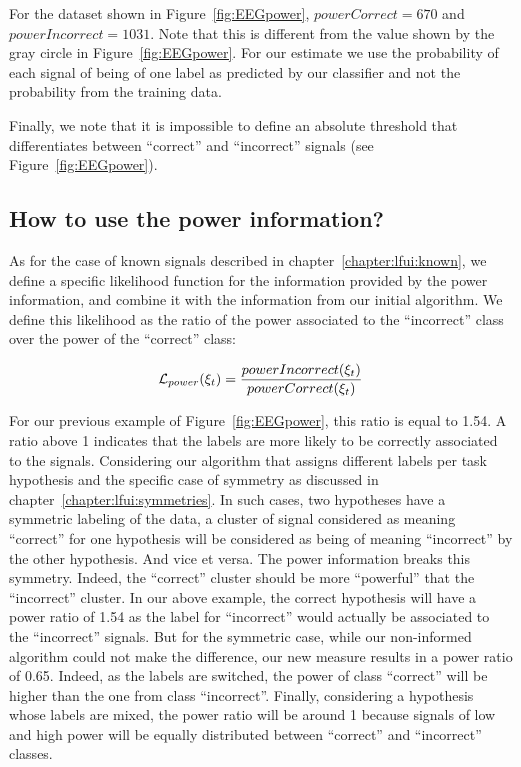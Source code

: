 For the dataset shown in Figure~\ref{fig:EEGpower}, $powerCorrect = 670$ and $powerIncorrect = 1031$. Note that this is different from the value shown by the gray circle in Figure~\ref{fig:EEGpower}. For our estimate we use the probability of each signal of being of one label as predicted by our classifier and not the probability from the training data.

Finally, we note that it is impossible to define an absolute threshold that differentiates between ``correct'' and ``incorrect'' signals (see Figure~\ref{fig:EEGpower}). 

\subsection{How to use the power information?}

As for the case of known signals described in chapter~\ref{chapter:lfui:known}, we define a specific likelihood function for the information provided by the power information, and combine it with the information from our initial algorithm. We define this likelihood as the ratio of the power associated to the ``incorrect'' class over the power of the ``correct'' class:

\begin{eqnarray}
\mathcal{L}_{power}(\xi_t) = \frac{powerIncorrect(\xi_t)}{powerCorrect(\xi_t)}
\label{eq:power}
\end{eqnarray}

For our previous example of Figure~\ref{fig:EEGpower}, this ratio is equal to 1.54. A ratio above 1 indicates that the labels are more likely to be correctly associated to the signals. Considering our algorithm that assigns different labels per task hypothesis and the specific case of symmetry as discussed in chapter~\ref{chapter:lfui:symmetries}. In such cases, two hypotheses have a symmetric labeling of the data, a cluster of signal considered as meaning ``correct'' for one hypothesis will be considered as being of meaning ``incorrect'' by the other hypothesis. And vice et versa. The power information breaks this symmetry. Indeed, the ``correct'' cluster should be more ``powerful'' that the ``incorrect'' cluster. In our above example, the correct hypothesis will have a power ratio of 1.54 as the label for ``incorrect'' would actually be associated to the ``incorrect'' signals. But for the symmetric case, while our non-informed algorithm could not make the difference, our new measure results in a power ratio of 0.65. Indeed, as the labels are switched, the power of class ``correct'' will be higher than the one from class ``incorrect''. Finally, considering a hypothesis whose labels are mixed, the power ratio will be around 1 because signals of low and high power will be equally distributed between ``correct'' and ``incorrect'' classes. 

